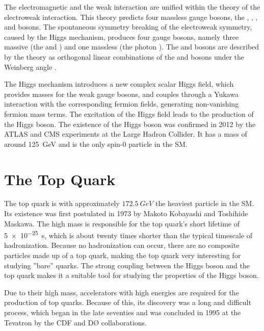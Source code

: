 The electromagnetic and the weak interaction are unified within the theory of the electroweak interaction. This theory predicts four massless gauge bosons, the \PBzero, \PWone, \PWtwo, and \PWthree bosons. The spontaneous symmetry breaking of the electroweak symmetry, caused by the Higgs mechanism, produces four gauge bosons, namely three massive (the \PZzero and \PWpm) and one massless (the photon \Pphoton). The \PZzero and \PWpm bosons are described by the theory as orthogonal linear combinations of the \PBzero and \PWone bosons under the Weinberg angle \cite{wiki:electroweak}.

The Higgs mechanism introduces a new complex scalar Higgs field, which provides masses for the weak gauge bosons, and couples through a Yukawa interaction with the corresponding fermion fields, generating non-vanishing fermion mass terms. The excitation of the Higgs field leads to the production of the Higgs boson. The existence of the Higgs boson was confirmed in 2012 by the ATLAS and CMS experiments at the Large Hadron Collider. It has a mass of around \SI{125}{\giga\eV} \cite{Cha12} and is the only spin-0 particle in the SM.

\section{The Top Quark}
\label{sec:theory_top}
The top quark is with approximately $\SI{172.5}{GeV}$ \cite{ACCC14} the heaviest particle in the SM. Its existence was first postulated in 1973 by Makoto Kobayashi and Toshihide Maskawa. The high mass is responsible for the top quark's short lifetime of \SI{5e-25}{s}, which is about twenty times shorter than the typical timescale of hadronization. Because no hadronization can occur, there are no composite particles made up of a top quark, making the top quark very interesting for studying ''bare'' quarks. The strong coupling between the Higgs boson and the top quark makes it a suitable tool for studying the properties of the Higgs boson.

Due to their high mass, accelerators with high energies are required for the production of top quarks. Because of this, its discovery was a long and difficult process, which began in the late seventies \cite{RevModPhys.69.137} and was concluded in 1995 at the Tevatron by the CDF and D\O{} collaborations.

